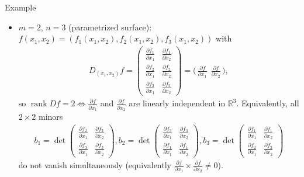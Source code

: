 \begin{frame}{Example}
\begin{itemize}
\item $m=2$, $n=3$ (parametrized surface):
$f(x_1,x_2)=(f_1(x_1,x_2),f_2(x_1,x_2),f_3(x_1,x_2))$ with
\begin{align*}
D_{(x_1,x_2)} f
=\begin{pmatrix}
\frac{\partial f_1}{\partial x_1} & \frac{\partial f_1}{\partial x_2} \\[4pt]
\frac{\partial f_2}{\partial x_1} & \frac{\partial f_2}{\partial x_2} \\[4pt]
\frac{\partial f_3}{\partial x_1} & \frac{\partial f_3}{\partial x_2}
\end{pmatrix}
=\big(\,\frac{\partial f}{\partial x_1}\ \ \frac{\partial f}{\partial x_2}\,\big),
\end{align*}
so $\operatorname{rank} D f=2 \Leftrightarrow \frac{\partial f}{\partial x_1}$
and $\frac{\partial f}{\partial x_2}$ are linearly independent in $\mathbb{R}^3$.
Equivalently, all $2\times 2$ minors
\begin{align*}
b_1=\det\!
\begin{pmatrix}
\frac{\partial f_2}{\partial x_1} & \frac{\partial f_2}{\partial x_2} \\[4pt]
\frac{\partial f_3}{\partial x_1} & \frac{\partial f_3}{\partial x_2}
\end{pmatrix},
b_2=\det\!
\begin{pmatrix}
\frac{\partial f_3}{\partial x_1} & \frac{\partial f_3}{\partial x_2} \\[4pt]
\frac{\partial f_1}{\partial x_1} & \frac{\partial f_1}{\partial x_2}
\end{pmatrix},
b_3=\det\!
\begin{pmatrix}
\frac{\partial f_1}{\partial x_1} & \frac{\partial f_1}{\partial x_2} \\[4pt]
\frac{\partial f_2}{\partial x_1} & \frac{\partial f_2}{\partial x_2}
\end{pmatrix}
\end{align*}
do not vanish simultaneously (equivalently
$\frac{\partial f}{\partial x_1} \times \frac{\partial f}{\partial x_2} \neq 0$).
\end{itemize}
\end{frame}

